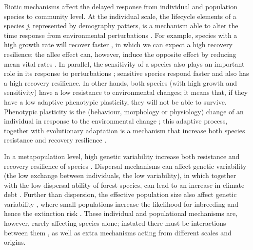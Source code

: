 Biotic mechanisms affect the delayed response from individual and population species to community level.
At the individual scale, the lifecycle elements of a species \textit{j}, represented by demography patters, is a mechanism able to alter the time response from environmental perturbations \citep{Bertrand2016}.
For example, species with a high growth rate will recover faster \citep{Grman2010}, in which we can expect a high recovery resilience; the allee effect can, however, induce the opposite effect by reducing mean vital rates \citep{Dennis2002}.
In parallel, the sensitivity of a species also plays an important role in its response to perturbations \citep{Oliver2015,Bertrand2016}; sensitive species respond faster and also has a high recovery resilience.
In other hands, both species (with high growth and sensitivity) have a low resistance to environmental changes; it means that, if they have a low adaptive phenotypic plasticity, they will not be able to survive.
Phenotypic plasticity is the (behaviour, morphology or physiology) change of an individual in response to the environmental change \citep{Price2003}; this adaptive process, together with evolutionary adaptation \citep{Bertrand2016} is a mechanism that increase both species resistance and recovery resilience \citep{Essl2015,Oliver2015}.

In a metapopulation level, high genetic variability increase both resistance and recovery resilience of species \citep{Hylander2013,Oliver2015}.
Dispersal mechanisms can affect genetic variability (the low exchange between individuals, the low variability), in which together with the low dispersal ability of forest species, can lead to an increase in climate debt \citep{Hylander2013,Bertrand2016}.
Further than dispersion, the effective population size also affect genetic variability \citep{Oliver2015}, where small populations increase the likelihood for inbreeding and hence the extinction risk \citep{Nieminen2001}.
These individual and populational mechanisms are, however, rarely affecting species alone; instated there must be interactions between them \citep{Hylander2013}, as well as extra mechanisms acting from different scales and origins.

